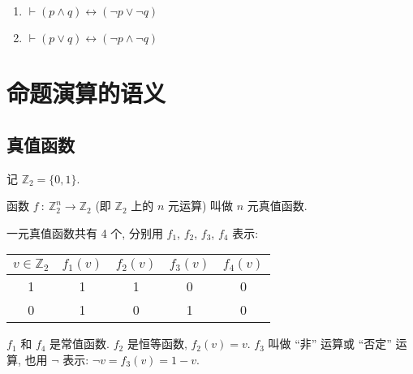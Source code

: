 \documentclass[
    mode=hazy,
    color=blue,
    device=normal,
    lang=cn
]{elegantnote}
\begin{document}
\begin{proposition}[De. Morgan 律]
    \begin{enumerate}[label=$\arabic*^\circ$, topsep = -1em]
        \item $\vdash (p\land q)\leftrightarrow (\lnot p\lor \lnot q)$
        \item $\vdash (p\lor q)\leftrightarrow (\lnot p\land \lnot q)$
    \end{enumerate}
\end{proposition}
\section{命题演算的语义}
\subsection{真值函数}
记 $\mathbb{Z}_2=\{0,1\}$.
\begin{definition}[真值函数]
    函数 $f\ :\ \mathbb{Z}_2^n\to\mathbb{Z}_2$ (即 $\mathbb{Z}_2$ 上的 $n$ 元运算) 叫做 $n$ 元真值函数.
\end{definition}
\begin{example}[一元真值函数]
    一元真值函数共有 4 个, 分别用 $f_1$, $f_2$, $f_3$, $f_4$ 表示:
    \begin{center}
        \begin{tabular}{c|cccc}
            $v\in\mathbb{Z}_2$ & $f_1(v)$ & $f_2(v)$ & $f_3(v)$ & $f_4(v)$ \\
            \hline
            1                  & 1        & 1        & 0        & 0        \\
            0                  & 1        & 0        & 1        & 0
        \end{tabular}
    \end{center}
    $f_1$ 和 $f_4$ 是常值函数.
    $f_2$ 是恒等函数, $f_2(v)=v$.
    $f_3$ 叫做 ``非'' 运算或 ``否定'' 运算, 也用 $\lnot$ 表示: $\lnot v=f_3(v)=1-v$.
\end{example}
\end{document}
